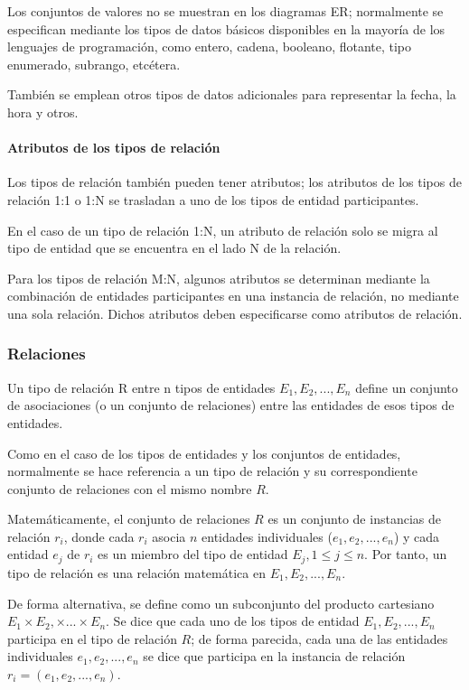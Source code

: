 Los conjuntos de valores no se muestran en los diagramas ER; normalmente se especifican mediante los tipos de datos básicos disponibles en la mayoría de los lenguajes de programación, como entero, cadena, booleano, flotante, tipo enumerado, subrango, etcétera. 


También se emplean otros tipos de datos adicionales para representar la fecha, la hora y otros.

\paragraph*{Atributos de los tipos de relación}


Los tipos de relación también pueden tener atributos; los atributos de los tipos de relación 1:1 o 1:N se trasladan a uno de los tipos de entidad participantes.


En el caso de un tipo de relación 1:N, un atributo de relación solo se migra al tipo de entidad que se encuentra en el lado N de la relación. 


Para los tipos de relación M:N, algunos atributos se determinan mediante la combinación de entidades participantes en una instancia de relación, no mediante una sola relación. Dichos atributos deben especificarse como atributos de relación.

\subsubsection{Relaciones}

Un tipo de relación R entre n tipos de entidades $E_1, E_2, ..., E_n$ define un conjunto de asociaciones (o un conjunto de relaciones) entre las entidades de esos tipos de entidades. 


Como en el caso de los tipos de entidades y los conjuntos de entidades, normalmente se hace referencia a un tipo de relación y su correspondiente conjunto de relaciones con el mismo nombre $R$.


Matemáticamente, el conjunto de relaciones $R$ es un conjunto de instancias de relación $r_i$, donde cada $r_i$ asocia $n$ entidades individuales ($e_1, e_2,..., e_n$) y cada entidad $e_j$ de $r_i$ es un miembro del tipo de entidad $E_j, 1 \leq j \leq n$. Por tanto, un tipo de relación es una relación matemática en $E_1, E_2,..., E_n$.


De forma alternativa, se define como un subconjunto del producto cartesiano $E_1 \times E_2,\times ... 	\times E_n$. Se dice que cada uno de los tipos de entidad $E_1, E_2,..., E_n$ participa en el tipo de relación $R$; de forma parecida, cada una de las entidades individuales $e_1, e_2,..., e_n$ se dice que participa en la instancia de relación $r_i = (e_1, e_2,..., e_n)$.


